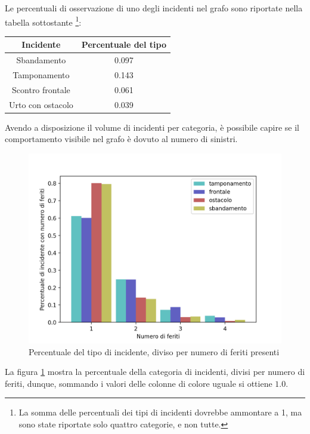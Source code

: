 \documentclass[a4paper]{report}
\begin{document}
Le percentuali di osservazione di uno degli incidenti nel grafo sono riportate nella 
tabella sottostante
\footnote{La somma delle percentuali dei tipi di incidenti dovrebbe ammontare a 1, ma sono state 
riportate solo quattro categorie, e non tutte.}: 

\begin{center}
    \def\arraystretch{1.5}%
    \begin{tabular}{ |c|c| } 
    \hline
    Incidente & Percentuale del tipo \\ 
    \hline
    \rowcolor{TableGray}
    Sbandamento       & 0.097 \\
    Tamponamento      & 0.143 \\
    \rowcolor{TableGray}
    Scontro frontale  & 0.061 \\
    Urto con ostacolo & 0.039 \\
    \hline
    \end{tabular}
\end{center}

Avendo a disposizione il volume di incidenti per categoria, è possibile capire se il comportamento 
visibile nel grafo è dovuto al numero di sinistri. 

\begin{figure}
    \includegraphics[width=\linewidth]{../src/incidenti/incidenti_senza_coords/natura_incidente/perc_natura_incidente.png}
    \caption{Percentuale del tipo di incidente, diviso per numero di feriti presenti}
    \label{fig:perc-numero-feriti}
\end{figure}

La figura \ref{fig:perc-numero-feriti} mostra la percentuale della categoria di incidenti, divisi per 
numero di feriti, dunque, sommando i valori delle colonne di colore uguale si ottiene $1.0$.
\end{document}

